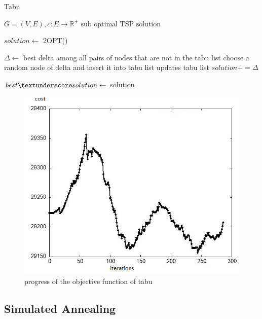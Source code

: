 \begin{algorithm}[h!]
    \caption{Tabu}\label{algo:tabu}
    \begin{algorithmic}[1]
    \Require $G = (V,E), c:E \to \mathbb{R}^+$
    \Ensure $\text{sub optimal TSP solution}$


    \State $solution \gets$ 2OPT()
    
    \State $\Delta\gets$ best delta among all pairs of nodes that are not in the tabu list
    \State choose a random node of delta and insert it into tabu list
    \State updates tabu list
    \State $solution += \Delta$

    \State $ best\textunderscore solution \gets$ solution
    \EndIf
    

    \EndWhile

    \end{algorithmic}
\end{algorithm}

\begin{figure}[!h]
    \centering
    \includegraphics[scale=0.8]{images/tabuperf.png}
    \caption{progress of the objective function of tabu}
    \label{fig:TABUPERF}
\end{figure}


\subsection{Simulated Annealing}

